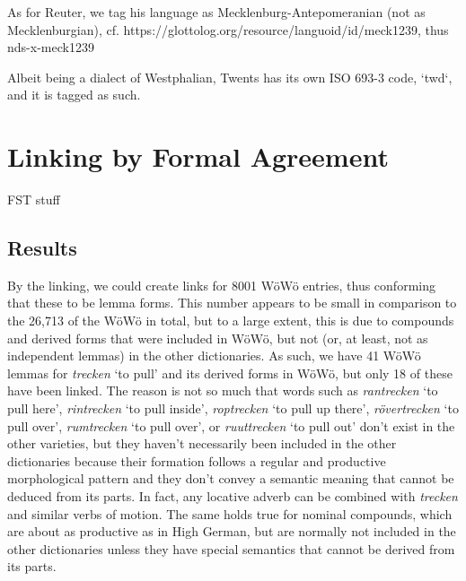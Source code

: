 \documentclass{article}
\newcommand{\word}[1]{\textsl{#1}}
\begin{document}
As for Reuter, we tag his language as Mecklenburg-Antepomeranian (not as Mecklenburgian), cf. https://glottolog.org/resource/languoid/id/meck1239, thus nds-x-meck1239

Albeit being a dialect of Westphalian, Twents has its own ISO 693-3 code, `twd`, and it is tagged as such.


\section{Linking by Formal Agreement}

FST stuff





\subsection{Results}


By the linking, we could create links for 8001 WöWö entries, thus conforming that these to be lemma forms. This number appears to be small in comparison to the 26,713 of the WöWö in total, but to a large extent, this is due to compounds and derived forms that were included in WöWö, but not (or, at least, not as independent lemmas) in the other dictionaries. As such, we have 41 WöWö lemmas for \word{trecken} `to pull' and its derived forms in WöWö, but only 18 of these have been linked. The reason is not so much that words such as \word{rantrecken} `to pull here', \word{rintrecken} `to pull inside', \word{roptrecken} `to pull up there', \word{rövertrecken} `to pull over', \word{rumtrecken} `to pull over', or \word{ruuttrecken} `to pull out' don't exist in the other varieties, but they haven't necessarily been included in the other dictionaries because their formation follows a regular and productive morphological pattern and they don't convey a semantic meaning that cannot be deduced from its parts. In fact, any locative adverb can be combined with \word{trecken} and similar verbs of motion. The same holds true for nominal compounds, which are about as productive as in High German, but are normally not included in the other dictionaries unless they have special semantics that cannot be derived from its parts.
\end{document}
